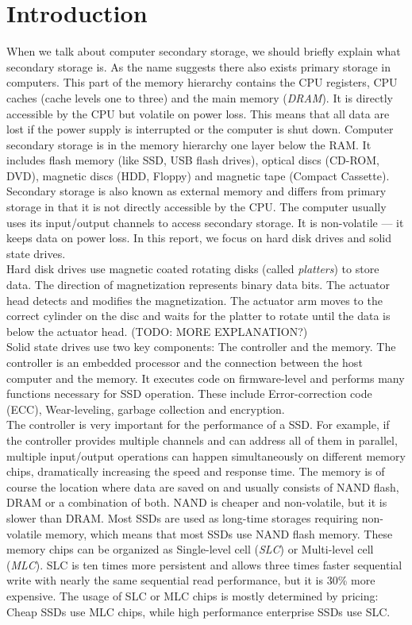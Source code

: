\documentclass{acm_proc_article-sp}
\begin{document}
\section{Introduction}
When we talk about computer secondary storage, we should briefly explain what secondary storage is. As the name suggests there also exists primary storage in computers. This part of the memory hierarchy contains the CPU registers, CPU caches (cache levels one to three) and the main memory (\emph{DRAM}). It is directly accessible by the CPU but volatile on power loss. This means that all data are lost if the power supply is interrupted or the computer is shut down. Computer secondary storage is in the memory hierarchy one layer below the RAM. It includes flash memory (like SSD, USB flash drives), optical discs (CD-ROM, DVD), magnetic discs (HDD, Floppy) and magnetic tape (Compact Cassette). Secondary storage is also known as external memory and differs from primary storage in that it is not directly accessible by the CPU. The computer usually uses its input/output channels to access secondary storage. It is non-volatile --- it keeps data on power loss. In this report, we focus on hard disk drives and solid state drives.
\\
Hard disk drives use magnetic coated rotating disks (called \emph{platters}) to store data. The direction of magnetization represents binary data bits. The actuator head detects and modifies the magnetization. The actuator arm moves to the correct cylinder on the disc and waits for the platter to rotate until the data is below the actuator head. (TODO: MORE EXPLANATION?) 
\\
Solid state drives use two key components: The controller and the memory. The controller is an embedded processor and the connection between the host computer and the memory. It executes code on firmware-level and performs many functions necessary for SSD operation. These include Error-correction code (ECC), Wear-leveling, garbage collection and encryption.
\\
The controller is very important for the performance of a SSD. For example, if the controller provides multiple channels and can address all of them in parallel, multiple input/output operations can happen simultaneously on different memory chips, dramatically increasing the speed and response time. The memory is of course the location where data are saved on and usually consists of NAND flash, DRAM or a combination of both. NAND is cheaper and non-volatile, but it is slower than DRAM. Most SSDs are used as long-time storages requiring non-volatile memory, which means that most SSDs use NAND flash memory. These memory chips can be organized as Single-level cell (\emph{SLC}) or Multi-level cell (\emph{MLC}). SLC is ten times more persistent and allows three times faster sequential write with nearly the same sequential read performance, but it is 30\% more expensive. The usage of SLC or MLC chips is mostly determined by pricing: Cheap SSDs use MLC chips, while high performance enterprise SSDs use SLC.
\end{document}
